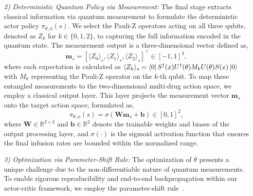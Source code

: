 \documentclass[pdflatex,sn-mathphys-num]{sn-jnl}%
\theoremstyle{thmstyleone}%
\theoremstyle{thmstyletwo}%
\theoremstyle{thmstylethree}%
\begin{document}
\noindent\textit{2) Deterministic Quantum Policy via Measurement:}
The final stage extracts classical information via quantum measurement to formulate the deterministic actor policy $\pi_{\theta, \phi}(s)$. We select the Pauli-Z operators acting on all three qubits, denoted as $Z_k$ for $k \in \{0, 1, 2\}$, to capturing the full information encoded in the quantum state. The measurement output is a three-dimensional vector defined as,
\begin{equation}
    \mathbf{m}_s = [\langle Z_0 \rangle_s, \langle Z_1 \rangle_s, \langle Z_2 \rangle_s]^\top \in [-1, 1]^3,
\end{equation}
where each expectation is calculated as $\langle Z_k \rangle_s = \bra{0} S^\dagger(x) U^\dagger(\theta) M_k U(\theta) S(x) \ket{0}$ with $M_k$ representing the Pauli-Z operator on the $k$-th qubit. To map these entangled measurements to the two-dimensional multi-drug action space, we employ a classical output layer. This layer projects the measurement vector $\mathbf{m}_s$ onto the target action space, formulated as,
\begin{equation}
    \pi_{\theta, \phi}(s) = \sigma \left( \mathbf{W} \mathbf{m}_s + \mathbf{b} \right) \in [0, 1]^2,  
%     
\end{equation}
where $\mathbf{W} \in \mathbb{R}^{2 \times 3}$ and $\mathbf{b} \in \mathbb{R}^2$ denote the trainable weights and biases of the output processing layer, and $\sigma(\cdot)$ is the sigmoid activation function that ensures the final infusion rates are bounded within the normalized range.

\noindent\textit{3) Optimization via Parameter-Shift Rule:}
The optimization of $\theta$ presents a unique challenge due to the non-differentiable nature of quantum measurements. To enable rigorous reproducibility and end-to-end backpropagation within our actor-critic framework, we employ the parameter-shift rule~\citep{sch_19_eva}. 

\end{document}
